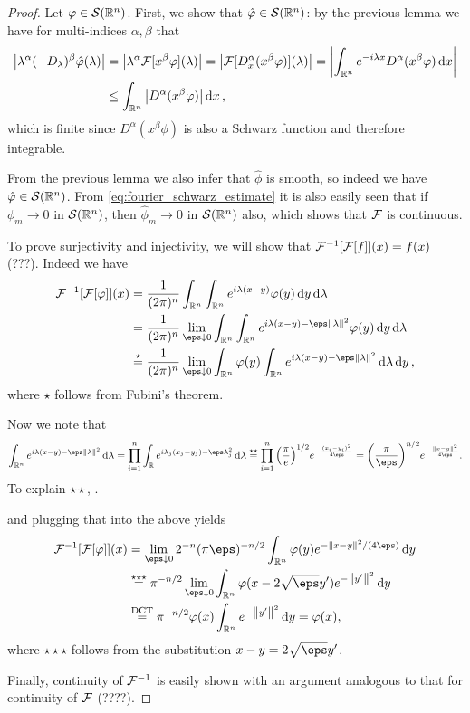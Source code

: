 \begin{proof}
	Let $\varphi \in \mathcal S(\mathbb R^n)$. First, we show that $\hat{\varphi} \in \mathcal S(\mathbb R^n)$: by the previous lemma we have for multi-indices $\alpha, \beta$ that
	\begin{align}
		\abs{\lambda^\alpha (-D_\lambda)^\beta \hat{\varphi}(\lambda)} &= \abs{\lambda^\alpha \mathcal F[x^\beta\varphi](\lambda)} = \abs{\mathcal F[D^\alpha_x (x^\beta\varphi)](\lambda)} = \abs{\int_{\mathbb R^n} e^{-i\lambda x} D^\alpha(x^\beta\varphi) \dd{x}} \nonumber \\
		&\leq \int_{\mathbb R^n} \abs{D^\alpha (x^\beta\varphi)} \dd{x} \label{eq:fourier_schwarz_estimate},
	\end{align}
which is finite since $D^\alpha (x^\beta\phi)$ is also a Schwarz function and therefore integrable. 

From the previous lemma we also infer that $\hat\phi$ is smooth, so indeed we have $\hat{\varphi} \in \mathcal S(\mathbb R^n)$. 
From \cref{eq:fourier_schwarz_estimate} it is also easily seen that if $\phi_m \to 0$ in $\mathcal S(\mathbb R^n)$, then $\hat\phi_m \to 0$ in $\mathcal S(\mathbb R^n)$ also, which shows that $\mathcal F$ is continuous. 

To prove surjectivity and injectivity, we will show that $\mathcal F^{-1}[\mathcal F[f]](x) = f(x)$ (???). Indeed we have
\begin{align*}
	\FF^{-1} [\FF[\phi]](x) &= \frac{1}{(2\pi)^n} \int_{\RR^n} \int_{\RR^n} e^{i\lambda (x-y)} \phi(y) \dd{y}\dd{\lambda} \\
	&= \frac{1}{(2\pi)^n} \lim_{\eps \downarrow 0} \int_{\RR^n} \int_{\RR^n} e^{i \lambda ( x- y) - \eps\norm{\lambda}^2} \phi(y) \dd{y}\dd{\lambda} \\
	&\overset\star= \frac{1}{(2\pi)^n}\lim_{\eps \downarrow 0} \int_{\RR^n} \phi(y)\int_{\RR^n} e^{i\lambda(x- y) - \eps\norm{\lambda}^2} \dd{\lambda} \dd{y},
\end{align*}
where $\star$ follows from Fubini's theorem. 

Now we note that 
\[
\int_{\RR^n} e^{i\lambda(x-y) - \eps\norm{\lambda}^2} \dd{\lambda} = \prod_{i=1}^n \int_{\RR} e^{i\lambda_j(x_j - y_j) - \eps\lambda_j^2} \dd{\lambda} \overset{\star\star}= \prod_{i=1}^n \qty(\frac\pi e)^{1/2} e^{- \frac{(x_i - y_i)^2}{4\eps}} = \qty(\frac\pi\eps)^{n/2} e^{- \frac{\norm{x - y}^2}{4\eps}}.
\] 
To explain $\star\star$, \TODO. 


and plugging that into the above yields 
\begin{align*}
\FF^{-1}[\FF[\phi]](x) &= \lim_{\eps\downarrow 0} 2^{-n}(\pi \eps)^{-n/2} \int_{\RR^n} \phi(y) e^{-\norm{x-y}^2/(4\eps)} \dd{y} \\
&\overset{\star\star\star}= \pi^{-n/2} \lim_{\eps\downarrow0}\int_{\RR^n} \phi(x - 2\sqrt\eps y') e^{-\norm{y'}^2} \dd{y} \\
&\overset{\text{DCT}}=\pi^{-n/2} \phi(x) \int_{\RR^n} e^{-\norm{y'}^2} \dd{y} = \phi(x),
\end{align*}
where $\star\star\star$ follows from the substitution $x - y = 2\sqrt\eps y'$.

Finally, continuity of $\mathcal F^{-1}$ is easily shown with an argument analogous to that for continuity of $\mathcal F$ (????). 
\end{proof}


